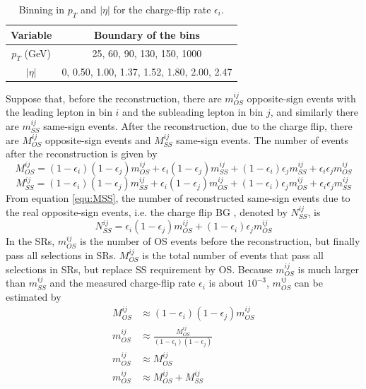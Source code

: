 \begin{table}[htbp]
\centering
\begin{tabular}{|c|c|}
\hline
Variable & Boundary of the bins \\
\hline
$p_T$ (GeV) &  25, 60, 90, 130, 150, 1000 \\
\hline
$|\eta|$ & 0, 0.50, 1.00, 1.37, 1.52, 1.80, 2.00, 2.47 \\
\hline
\end{tabular}
\caption{Binning in $p_T$ and $|\eta|$ for the charge-flip rate $\epsilon_i$.}
\label{tab:binning_charge_flip}
\end{table}

Suppose that, before the reconstruction, there are $m^{ij}_{OS}$ opposite-sign events with the leading lepton in bin $i$ and the subleading lepton in bin $j$, and similarly there are $m^{ij}_{SS}$ same-sign events.
After the reconstruction, due to the charge flip, there are $M^{ij}_{OS}$ opposite-sign events and $M^{ij}_{SS}$ same-sign events.
The number of events after the reconstruction is given by
\begin{equation}
M^{ij}_{OS} = (1-\epsilon_i) (1-\epsilon_j) m^{ij}_{OS} + \epsilon_i (1-\epsilon_j) m^{ij}_{SS} + (1-\epsilon_i) \epsilon_j m^{ij}_{SS} + \epsilon_i \epsilon_j m^{ij}_{OS}
\end{equation}
\begin{equation}
M^{ij}_{SS} = (1-\epsilon_i) (1-\epsilon_j) m^{ij}_{SS} + \epsilon_i (1-\epsilon_j) m^{ij}_{OS} + (1-\epsilon_i) \epsilon_j m^{ij}_{OS} + \epsilon_i \epsilon_j m^{ij}_{SS}
\label{equ:MSS}
\end{equation}
From equation \ref{equ:MSS}, the number of reconstructed same-sign events due to the real opposite-sign events, i.e. the charge flip BG , denoted by $N^{ij}_{SS}$, is
\begin{equation}
N^{ij}_{SS} = \epsilon_i (1-\epsilon_j) m^{ij}_{OS} + (1-\epsilon_i) \epsilon_j m^{ij}_{OS}
\label{equ:NSS}
\end{equation}
In the SRs, $m^{ij}_{OS}$ is the number of OS events before the reconstruction, but finally pass all selections in SRs.
$M^{ij}_{OS}$ is the total number of events that pass all selections in SRs, but replace SS requirement by OS.
Because $m^{ij}_{OS}$ is much larger than $m^{ij}_{SS}$ and the measured charge-flip rate $\epsilon_i$ is about $10^{-3}$, $m^{ij}_{OS}$ can be estimated by
\begin{align}
M^{ij}_{OS} &\approx (1-\epsilon_i) (1-\epsilon_j) m^{ij}_{OS} \\
m^{ij}_{OS} &\approx \frac{ M^{ij}_{OS} }{ (1-\epsilon_i) (1-\epsilon_j) }
\label{equ:mapp1} \\
m^{ij}_{OS} &\approx M^{ij}_{OS} \\
m^{ij}_{OS} &\approx M^{ij}_{OS} + M^{ij}_{SS}
\label{equ:mapp2}
\end{align}
